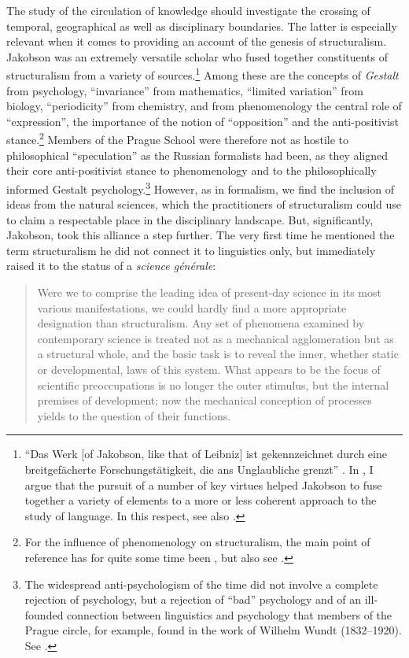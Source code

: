 \documentclass[output=paper]{langscibook}
\begin{document}
The study of the circulation of knowledge should investigate the crossing of temporal, geographical as well as disciplinary boundaries. The latter is especially relevant when it comes to providing an account of the genesis of structuralism. Jakobson was an extremely versatile scholar who fused together constituents of structuralism from a variety of sources.\footnote{``Das Werk [of Jakobson, like that of Leibniz] ist gekennzeichnet durch eine breitgefächerte Forschungstätigkeit, die ans Unglaubliche grenzt'' \citep[17]{Holenstein1975}. In \citet{Karstens2017lonely}, I argue that the pursuit of a number of key virtues helped Jakobson to fuse together a variety of elements to a more or less coherent approach to the study of language. In this respect, see also \citet{Karstens2017blog}.} Among these are the concepts of \emph{Gestalt} from psychology, ``invariance'' from mathematics, ``limited variation'' from biology, ``periodicity'' from chemistry, and from phenomenology the central role of ``expression'', the importance of the notion of ``opposition'' and the anti-positivist stance.\footnote{For the influence of phenomenology on structuralism, the main point of reference has for quite some time been \citet{Holenstein1975}, but also see \citet{Flack2016}.} Members of the Prague School were therefore not as hostile to philosophical ``speculation'' as the Russian formalists had been, as they aligned their core anti-positivist stance to phenomenology and to the philosophically informed Gestalt psychology.\footnote{The widespread anti-psychologism of the time did not involve a complete rejection of psychology, but a rejection of ``bad'' psychology and of an ill-founded connection between linguistics and psychology that members of the Prague circle, for example, found in the work of Wilhelm Wundt (1832--1920). See \citet[139]{Toman1995}.} However, as in formalism, we find the inclusion of ideas from the natural sciences, which the practitioners of structuralism could use to claim a respectable place in the disciplinary landscape. But, significantly, Jakobson, took this alliance a step further. The very first time he mentioned the term structuralism he did not connect it to linguistics only, but immediately raised it to the status of a \emph{science générale}:

\begin{quotation}
Were we to comprise the leading idea of present-day science in its most various manifestations, we could hardly find a more appropriate designation than structuralism. Any set of phenomena examined by contemporary science is treated not as a mechanical agglomeration but as a structural whole, and the basic task is to reveal the inner, whether static or developmental, laws of this system. What appears to be the focus of scientific preoccupations is no longer the outer stimulus, but the internal premises of development; now the mechanical conception of processes yields to the question of their functions. \citep[11]{Jakobson1929}
\end{quotation}
\end{document}
